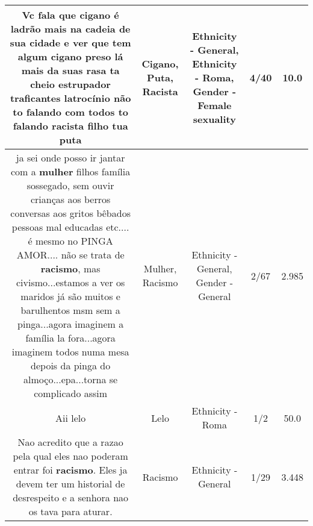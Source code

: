 \documentclass[11pt]{article}
\newlength\mylength
\begin{document}
\begin{center}
\begin{longtable}{|C{.65\mylength}|C{.30\mylength}|C{.12\mylength}|C{.12\mylength}|C{.12\mylength}|}
  \small Vc fala que \textbf{cigano} é ladrão mais na cadeia de sua cidade e ver que tem algum \textbf{cigano} preso lá mais da suas rasa ta cheio estrupador traficantes latrocínio não to falando com todos to falando \textbf{racista} filho tua puta\normalsize   & Cigano, Puta, Racista & Ethnicity - General, Ethnicity - Roma, Gender - Female sexuality & 4/40 & 10.0 \\  \hline
  \small ja sei onde posso ir jantar com a \textbf{mulher} filhos família sossegado, sem ouvir crianças aos berros conversas aos gritos bêbados pessoas mal educadas etc.... é mesmo no PINGA AMOR.... não se trata de \textbf{racismo}, mas civismo...estamos a ver os maridos já são muitos e barulhentos msm sem a pinga...agora imaginem a família la fora...agora imaginem todos numa mesa depois da pinga do almoço...epa...torna se complicado assim\normalsize   & Mulher, Racismo & Ethnicity - General, Gender - General & 2/67 & 2.985 \\  \hline
  \small Aii lelo\normalsize   & Lelo & Ethnicity - Roma & 1/2 & 50.0 \\  \hline
  \small Nao acredito que a razao pela qual eles nao poderam entrar foi \textbf{racismo}. Eles ja devem ter um historial de desrespeito e a senhora nao os tava para aturar.\normalsize   & Racismo & Ethnicity - General & 1/29 & 3.448 \\  \hline

\end{longtable}
\end{center}
\end{document}

